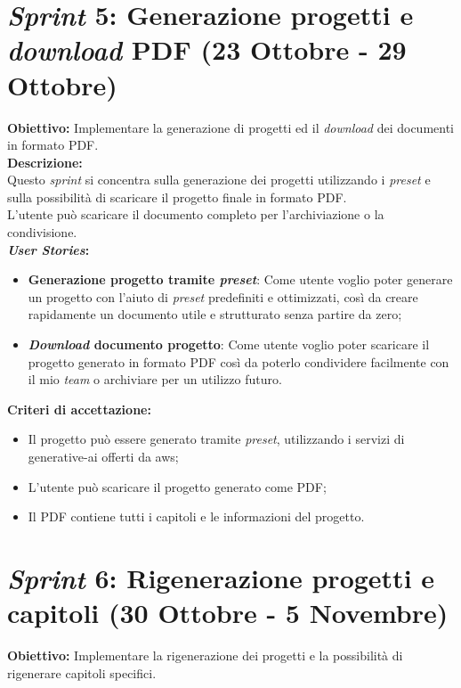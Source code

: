 \section*{\textit{Sprint} 5: Generazione progetti e \textit{download} PDF (23 Ottobre - 29 Ottobre)}
\textbf{Obiettivo:} Implementare la generazione di progetti ed il \textit{download} dei documenti in formato PDF.\\

\noindent \textbf{Descrizione:}\\
\noindent Questo \textit{sprint} si concentra sulla generazione dei progetti utilizzando i \textit{preset} e sulla possibilità di scaricare il progetto finale in formato PDF.\\
L'utente può scaricare il documento completo per l'archiviazione o la condivisione.\\

\noindent \textbf{\textit{User Stories}:} 
\begin{itemize}
    \item \textbf{Generazione progetto tramite \textit{preset}}: Come utente voglio poter generare un progetto con l'aiuto di \textit{preset} predefiniti e ottimizzati, così da creare rapidamente un documento utile e strutturato senza partire da zero;\\
    \item \textbf{\textit{Download} documento progetto}: Come utente voglio poter scaricare il progetto generato in formato PDF così da poterlo condividere facilmente con il mio \textit{team} o archiviare per un utilizzo futuro.\\
\end{itemize}

\noindent \textbf{Criteri di accettazione:}  
\begin{itemize}
    \item Il progetto può essere generato tramite \textit{preset}, utilizzando i servizi di \gls{generative-ai} offerti da \gls{aws};
    \item L'utente può scaricare il progetto generato come PDF;
    \item Il PDF contiene tutti i capitoli e le informazioni del progetto.
\end{itemize}

\pagebreak
\section*{\textit{Sprint} 6: Rigenerazione progetti e capitoli (30 Ottobre - 5 Novembre)}
\textbf{Obiettivo:} Implementare la rigenerazione dei progetti e la possibilità di rigenerare capitoli specifici.\\

